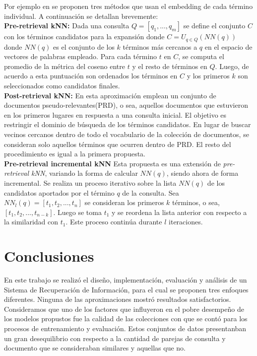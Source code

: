 \documentclass{llncs}
\begin{document}
Por ejemplo en \cite{190} se proponen tres métodos que usan el embedding de cada término individual. A continuación se detallan brevemente:
\\

\textbf{Pre-retrieval kNN: } Dada una consulta $Q = [q_1, ..., q_m]$ se define el conjunto $C$ con los términos candidatos para la expansión donde $C = U_{q \in Q}(NN(q)) $ donde $NN(q)$ es el conjunto de los $k$ términos más cercanos a $q$ en el espacio de vectores de palabras empleado. Para cada término $t$ en $C$, se computa el promedio de la métrica del coseno entre $t$ y el resto de términos en $Q$. Luego, de acuerdo a esta puntuación son ordenados los términos en $C$ y los primeros $k$ son seleccionados como candidatos finales.
\\

\textbf{Post-retrieval kNN: } En esta aproximación emplean un conjunto de documentos pseudo-relevantes(PRD), o sea, aquellos documentos que estuvieron en los primeros lugares en respuesta a una consulta inicial. El objetivo es restringir el dominio de búsqueda de los términos candidatos. En lugar de buscar vecinos cercanos dentro de todo el vocabulario de la colección de documentos, se consideran solo aquellos términos que ocurren dentro de PRD. El resto del procedimiento es igual a la primera propuesta.
\\

\textbf{Pre-retrieval incremental kNN}
Esta propuesta es una extensión de \textit{pre-retrieval kNN}, variando la forma de calcular $NN(q)$, siendo ahora de forma incremental. Se realiza un proceso iterativo sobre la lista $NN(q)$ de los candidatos aportados por el término $q$ de la consulta. Sea $NN_l(q) = [t_1, t_2, ..., t_n]$ se consideran los primeros $k$ términos, o sea, $[t_1, t_2, ..., t_{n-k}]$. Luego se toma $t_1$ y se reordena la lista anterior con respecto a la similaridad con $t_1$. Este proceso continúa durante $l$ iteraciones.


\section{Conclusiones}
 
 En este trabajo se realizó  el diseño, implementación, evaluación y análisis de un Sistema de Recuperación de Información, para el cual se proponen tres enfoques diferentes. Ninguna de las aproximaciones mostró resultados satisfactorios. Consideramos que uno de los factores que influyeron en el pobre desempeño de los modelos propustos fue la calidad de las colecciones con que se contó para los procesos de entrenamiento y evaluación. Estos conjuntos de datos presentanban un gran desequilibrio con respecto a la cantidad de parejas de consulta y documento que se consideraban similares y aquellas que no.
 
\end{document}
